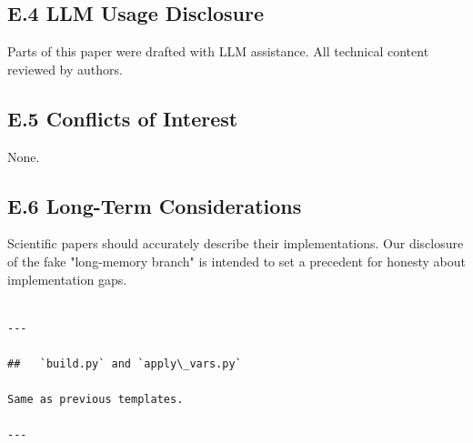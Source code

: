 \subsection{E.4 LLM Usage Disclosure}

Parts of this paper were drafted with LLM assistance. All technical content 
reviewed by authors.

\subsection{E.5 Conflicts of Interest}

None.

\subsection{E.6 Long-Term Considerations}

Scientific papers should accurately describe their implementations. Our 
disclosure of the fake "long-memory branch" is intended to set a precedent 
for honesty about implementation gaps.
\begin{lstlisting}

---

##   `build.py` and `apply\_vars.py`

Same as previous templates.

---
\end{lstlisting}